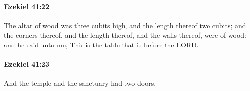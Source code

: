 		\paragraph{Ezekiel 41:22} %
			\label{EZEKIEL-41-22}

			The altar of wood was three cubits high, and the length thereof two cubits; and the corners thereof, and the length thereof, and the walls thereof, were of wood: and he said unto me, This is the table that is before the LORD.


		\paragraph{Ezekiel 41:23} %
			\label{EZEKIEL-41-23}

			And the temple and the sanctuary had two doors.


